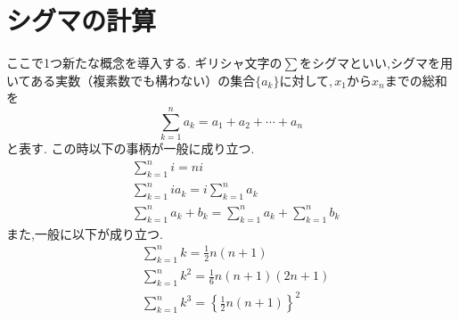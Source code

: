 
  \section{シグマの計算}
    ここで1つ新たな概念を導入する.
    ギリシャ文字の$\sum$をシグマといい,シグマを用いてある実数（複素数でも構わない）の集合$\{a_k\}$に対して,\,$x_1$から$x_n$までの総和を
    \[
      \sum_{k=1}^{n} a_k=a_1+a_2+\cdots+ a_n
    \]
    と表す.
    この時以下の事柄が一般に成り立つ.
    \begin{align*}
      &\sum_{k=1}^{n} i=ni\\
      &\sum_{k=1}^{n} ia_k=i\sum_{k=1}^{n} a_k\\
      &\sum_{k=1}^{n} a_k+b_k=\sum_{k=1}^{n} a_k+\sum_{k=1}^{n} b_k
    \end{align*}
    また,一般に以下が成り立つ.
    \begin{align*}
      &\sum_{k=1}^{n} k=\frac{1}{2}n(n+1)\\
      &\sum_{k=1}^{n} k^2=\frac{1}{6}n(n+1)(2n+1)\\
      &\sum_{k=1}^{n} k^3=\left\{\frac{1}{2}n(n+1)\right\}^2\\
    \end{align*}

